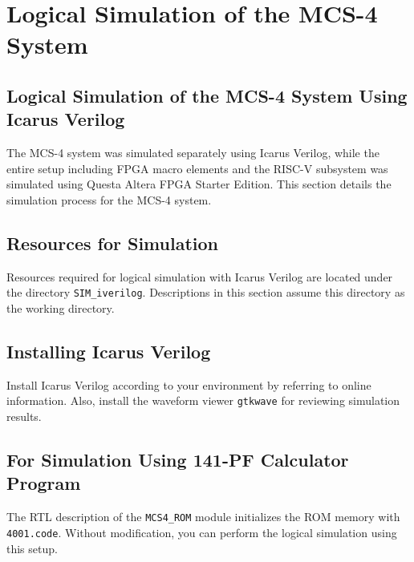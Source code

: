 \section{Logical Simulation of the MCS-4 System}
\subsection{Logical Simulation of the MCS-4 System Using Icarus Verilog}
The MCS-4 system was simulated separately using Icarus Verilog, while the entire setup including FPGA macro elements and the RISC-V subsystem was simulated using Questa Altera FPGA Starter Edition. This section details the simulation process for the MCS-4 system.

\subsection{Resources for Simulation}
Resources required for logical simulation with Icarus Verilog are located under the directory \texttt{SIM\_iverilog}. Descriptions in this section assume this directory as the working directory.

\subsection{Installing Icarus Verilog}
Install Icarus Verilog according to your environment by referring to online information. Also, install the waveform viewer \texttt{gtkwave} for reviewing simulation results.

\subsection{For Simulation Using 141-PF Calculator Program}
The RTL description of the \texttt{MCS4\_ROM} module initializes the ROM memory with \texttt{4001.code}. Without modification, you can perform the logical simulation using this setup.

